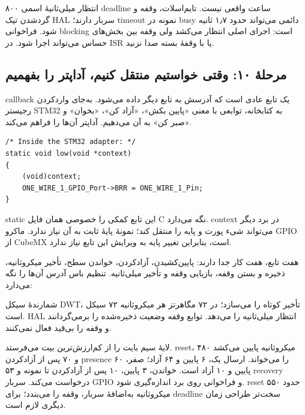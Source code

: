 ۸۰۰ انتظار میلی‌ثانیهٔ اسمی deadline ساعت واقعی نیست. تایم‌اسلات، وقفه و گردشدن تیک HAL سربار دارند؛ timeout نمونه در busy دائمی می‌تواند حدود ۱٫۷ ثانیه شود. فراخوانی blocking است: اجرای اصلی انتظار می‌کشد ولی وقفه بین بخش‌های حساس می‌تواند اجرا شود. در ISR یا با وقفهٔ بسته صدا نزنید.

\subsection{مرحلهٔ ۱۰: وقتی خواستیم منتقل کنیم، آداپتر را بفهمیم}
callback یک تابع عادی است که آدرسش به تابع دیگر داده می‌شود. به‌جای واردکردن رجیستر STM32 به کتابخانه، توابعی با معنی «پایین بکش»، «آزاد کن»، «بخوان» و «صبر کن» به آن می‌دهیم. آداپتر آن‌ها را فراهم می‌کند.
\begin{LTR}
\begin{lstlisting}
/* Inside the STM32 adapter: */
static void low(void *context)
{
    (void)context;
    ONE_WIRE_1_GPIO_Port->BRR = ONE_WIRE_1_Pin;
}
\end{lstlisting}
\end{LTR}
static این تابع کمکی را خصوصی همان فایل C نگه می‌دارد. context در برد دیگر می‌تواند شیء پورت و پایه را منتقل کند؛ نمونهٔ پایهٔ ثابت به آن نیاز ندارد. ماکرو GPIO از CubeMX است، بنابراین تغییر پایه به ویرایش این تابع نیاز ندارد.

هفت تابع، هفت کار جدا دارند: پایین‌کشیدن، آزادکردن، خواندن سطح، تأخیر میکروثانیه، ذخیره و بستن وقفه، بازیابی وقفه و تأخیر میلی‌ثانیه. تنظیم باس آدرس آن‌ها را نگه می‌دارد:
\begin{LTR}
\par\noindent\begin{minipage}{\linewidth}

\end{minipage}\par
\end{LTR}
شمارندۀ سیکل DWT، تأخیر کوتاه را می‌سازد؛ در ۷۲ مگاهرتز هر میکروثانیه ۷۲ سیکل است. HAL انتظار میلی‌ثانیه را می‌دهد. توابع وقفه وضعیت ذخیره‌شده را برمی‌گردانند و وقفه را بی‌قید فعال نمی‌کنند.

لایهٔ سیم بایت را از کم‌ارزش‌ترین بیت می‌فرستد. reset، ۴۸۰ میکروثانیه پایین می‌کشد و ۷۰ پس از آزادکردن presence را می‌خواند. ارسال یک، ۶ پایین و ۶۴ آزاد؛ صفر، ۶۰ پایین و ۱۰ آزاد است. خواندن، ۳ پایین، ۱۰ پس از آزادکردن تا نمونه و ۵۳ recovery درخواست می‌کند. سربار GPIO و فراخوانی روی برد اندازه‌گیری شود. reset حدود ۵۵۰ میکروثانیه به‌اضافهٔ سربار، وقفه را می‌بندد؛ برای deadline سخت‌تر طراحی زمان دیگری لازم است.

